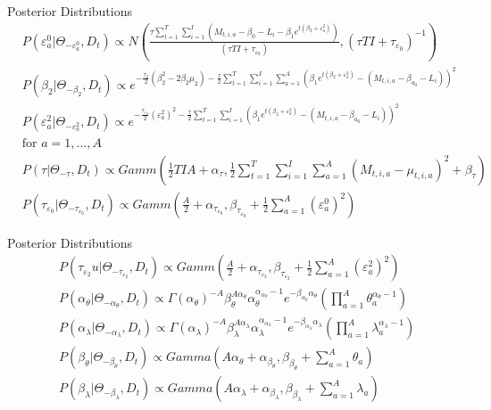 \documentclass[10pt]{beamer} %
\begin{document}
\begin{frame}{Posterior Distributions}
\begin{align*}
    &P(\varepsilon_a^0|\Theta_{-\varepsilon_a^0},D_{t})\propto N\left( \frac{\tau\sum_{t=1}^{T}\sum_{i=1}^{I}\left(M_{t,i,a}-\beta_{0}-L_i-\beta_{1}e^{t(\beta_{2}+\varepsilon_a^2)}\right)}{(\tau TI+\tau_{\varepsilon_0})},(\tau TI+\tau_{\varepsilon_0})^{-1} \right)\\
    &P(\beta_2|\Theta_{-\beta_{2}},D_t)\propto e^{-\frac{\tau_2}{2}(\beta_{2}^2-2\beta_{2}\mu_2)-\frac{\tau}{2}\sum_{t=1}^{T}\sum_{i=1}^{I}\sum_{a=1}^{A}\left(\beta_{1}e^{t(\beta_2+\varepsilon_a^2)}-(M_{t,i,a}-\beta_{a_0}-L_i)\right)^2}\\
    &P(\varepsilon_a^2|\Theta_{-\varepsilon_a^2},D_{t})\propto e^{-\frac{\tau_{\varepsilon_2}}{2}(\varepsilon_a^2)^2-\frac{\tau}{2}\sum_{t=1}^{T}\sum_{i=1}^{I}\left(\beta_{1}e^{t(\beta_{2}+\varepsilon_a^2)}-(M_{t,i,a}-\beta_{a_0}-L_i) \right)^2}\\ &\textrm{for }a=1,...,A\\
    &P(\tau|\Theta_{-\tau},D_{t})\propto Gamm\left(\frac{1}{2}TIA+\alpha_\tau, \frac{1}{2}\sum_{t=1}^{T}\sum_{i=1}^{I}\sum_{a=1}^{A}(M_{t,i,a}-\mu_{t,i,a})^2+\beta_\tau\right)\\
    &P(\tau_{\varepsilon_0}|\Theta_{-\tau_{\varepsilon_0}},D_{t})\propto Gamm\left(\frac{A}{2}+\alpha_{\tau_{\varepsilon_0}},\beta_{\tau_{\varepsilon_0}}+\frac{1}{2}\sum_{a=1}^{A}(\varepsilon_a^0)^2 \right)
\end{align*}
    
\end{frame}
\begin{frame}{Posterior Distributions}
    \begin{align*}
        &P(\tau_{\varepsilon_2}u|\Theta_{-\tau_{\varepsilon_2}},D_{t})\propto Gamm\left(\frac{A}{2}+\alpha_{\tau_{\varepsilon_2}},\beta_{\tau_{\varepsilon_2}}+\frac{1}{2}\sum_{a=1}^{A}(\varepsilon_a^2)^2 \right)\\
        &P(\alpha_\theta|\Theta_{-\alpha_\theta},D_{t})\propto \Gamma(\alpha_{\theta})^{-A}\beta_{\theta}^{A\alpha_{\theta}}\alpha_{\theta}^{\alpha_{\alpha_{\theta}}-1}e^{-\beta_{\alpha_{\theta}}\alpha_{\theta}}\left(\prod_{a=1}^{A}\theta_{a}^{\alpha_{\theta}-1}\right)\\
        &P(\alpha_\lambda|\Theta_{-\alpha_\lambda},D_{t})\propto \Gamma(\alpha_{\lambda})^{-A}\beta_{\lambda}^{A\alpha_{\lambda}}\alpha_{\lambda}^{\alpha_{\alpha_{\lambda}}-1}e^{-\beta_{\alpha_{\lambda}}\alpha_{\lambda}}\left(\prod_{a=1}^{A}\lambda_{a}^{\alpha_{\lambda}-1}\right)\\
        &P(\beta_{\theta}|\Theta_{-\beta_{\theta}},D_{t})\propto Gamma\left(A\alpha_{\theta}+\alpha_{\beta_{\theta}},\beta_{\beta_{\theta}}+\sum_{a=1}^{A}\theta_{a} \right)\\
        &P(\beta_{\lambda}|\Theta_{-\beta_{\lambda}},D_{t})\propto Gamma\left(A\alpha_{\lambda}+\alpha_{\beta_{\lambda}},\beta_{\beta_{\lambda}}+\sum_{a=1}^{A}\lambda_{a} \right)\\
    \end{align*}
\end{frame}
\end{document}

